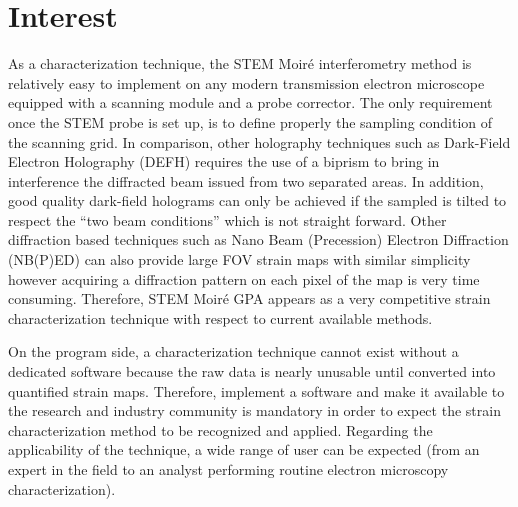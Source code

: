 \documentclass{article}
\begin{document}
\section{Interest}
As a characterization technique, the STEM Moir{\'e} interferometry method is
relatively easy to implement on any modern transmission electron microscope
equipped with a scanning module and a probe corrector. The only requirement once
the STEM probe is set up, is to define properly the sampling condition of the
scanning grid. In comparison, other holography techniques such as Dark-Field
Electron Holography (DEFH) \cite{Hytch2008} requires the use of a biprism to
bring in interference the diffracted beam issued from two separated areas. In
addition, good quality dark-field holograms can only be achieved if the sampled
is tilted to respect the ``two beam conditions''   which is not straight forward. Other
diffraction based techniques such as Nano Beam (Precession) Electron Diffraction
(NB(P)ED) \cite{Rouviere2013} can also provide large FOV strain maps with
similar simplicity however acquiring a diffraction pattern on each pixel of the
map is very time consuming. Therefore, STEM Moir{\'e} GPA appears as a very
competitive strain characterization technique with respect to current available
methods.\par \medskip On the program side, a characterization technique cannot
exist without a dedicated software because the raw data is nearly unusable until
converted into quantified strain maps. Therefore, implement a software and make
it available to the research and industry community is mandatory in order
  to
expect the strain characterization method to be recognized and
applied. Regarding the applicability of the technique, a wide range of user can
be expected (from an expert in the field to an analyst performing routine
electron microscopy characterization).




\end{document}
